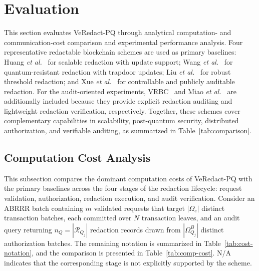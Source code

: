 \documentclass[lettersize,journal]{IEEEtran}
\begin{document}
\section{Evaluation}
\label{sec:evaluation}

This section evaluates VeRedact-PQ through analytical computation- and
communication-cost comparison and experimental performance analysis.
Four representative redactable blockchain schemes are used as primary
baselines: Huang \emph{et al.}~\cite{ref14} for scalable redaction with
update support; Wang \emph{et al.}~\cite{ref17} for quantum-resistant
redaction with trapdoor updates; Liu \emph{et al.}~\cite{ref27} for
robust threshold redaction; and Xue \emph{et al.}~\cite{ref33} for
controllable and publicly auditable redaction. For the audit-oriented
experiments, VRBC~\cite{ref13} and Miao \emph{et al.}~\cite{ref20} are
additionally included because they provide explicit redaction auditing
and lightweight redaction verification, respectively. Together, these
schemes cover complementary capabilities in scalability, post-quantum
security, distributed authorization, and verifiable auditing, as
summarized in Table~\ref{tab:comparison}.

\subsection{Computation Cost Analysis}
\label{subsec:computation-cost}

This subsection compares the dominant computation costs of VeRedact-PQ
with the primary baselines across the four stages of the redaction
lifecycle: request validation, authorization, redaction execution, and
audit verification. Consider an ABRRR batch containing $m$ validated
requests that target $|\Omega_e|$ distinct transaction batches, each
committed over $N$ transaction leaves, and an audit query returning
$n_Q=|\mathcal{R}_{Q_j}|$ redaction records drawn from
$|\Omega_{Q_j}^B|$ distinct authorization batches. The remaining
notation is summarized in Table~\ref{tab:cost-notation}, and the
comparison is presented in Table~\ref{tab:comp-cost}. N/A indicates that
the corresponding stage is not explicitly supported by the scheme.
\end{document}
